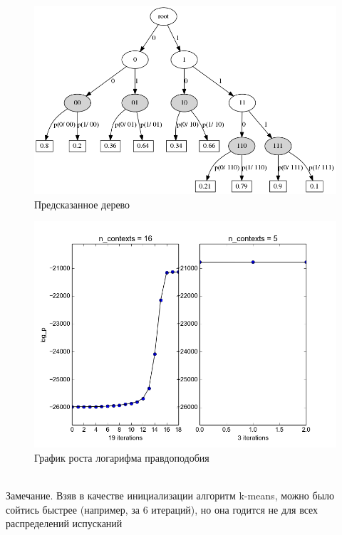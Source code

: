 \documentclass[10pt,a4paper]{article}
\begin{document}
\begin{enumerate}
\begin{figure}[ht]
{	}
\hfil \hfil%
\begin{minipage}[b]{0.49 \textwidth}
	\includegraphics[scale=0.3]{img/sim_predicted_trie.png}
	\centering
	\caption{ Предсказанное дерево }
	\label{ris:img_predicted_trie}
\end{minipage}
\end{figure}
\begin{figure}[hbtp]
	\includegraphics[scale=0.4]{img/sim_likelihood.png}
	\centering
	\caption{ График роста логарифма правдоподобия }
\label{ris:img_log_likelihood}
\end{figure}
\\
Замечание. Взяв в качестве инициализации алгоритм k-means, можно было сойтись быстрее (например, за 6 итераций), но она годится не для всех распределений испусканий
\end{enumerate}
\end{document}

